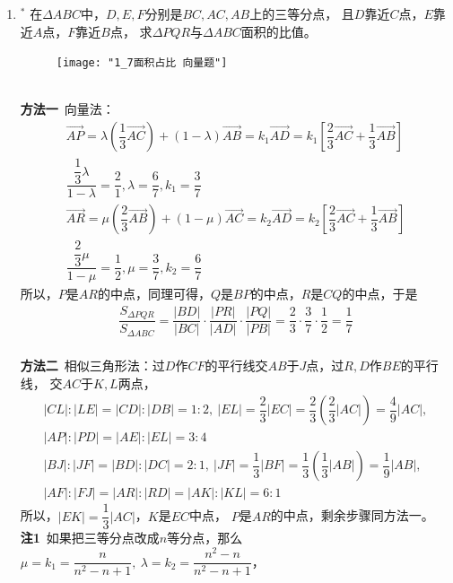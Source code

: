 \begin{enumerate}[label={【\textbf{例\thechapter.\arabic*}】},
 leftmargin=\inteval{\myenumleftmargin}pt,
 itemsep=\inteval{\myenumitempsep}pt,
 itemindent=\inteval{\myenumitemindent}pt]
\item $ ^* $
在$ \Delta ABC $中，$ D,E,F $分别是$ BC,AC,AB $上的三等分点，
且$ D $靠近$ C $点，$ E $靠近$ A $点，$ F $靠近$ B $点，
求$ \Delta PQR $与$ \Delta ABC $面积的比值。
\begin{figure}[!ht]
    \centering
    \texttt{[image: "1\_7面积占比 向量题"]}
\end{figure}
\\
\textbf{方法一}\ 向量法：\\
\begin{gather*}
    \vec{AP}=\lambda \left(\dfrac{1}{3}\vec{AC} 
    \right) +(1-\lambda)
    \vec{AB}=k_1\vec{AD}=k_1\left[
    \dfrac{2}{3}\vec{AC}+
    \dfrac{1}{3}\vec{AB}\right] \\
    \dfrac{\dfrac{1}{3}\lambda}{1-\lambda}=\dfrac{2}{1},
    \lambda=\dfrac{6}{7},k_1=\dfrac{3}{7} \\
    \vec{AR}=\mu \left(\dfrac{2}{3}\vec{AB} \right) +(1-\mu)\vec{AC}=k_2\vec{AD}=k_2\left[ \dfrac{2}{3}\vec{AC}+
    \dfrac{1}{3}\vec{AB} \right] \\
    \dfrac{\dfrac{2}{3}\mu}{1-\mu}=\dfrac{1}{2},\mu=\dfrac{3}{7},
    k_2=\dfrac{6}{7} 
\end{gather*}
所以，$ P $是$ AR $的中点，同理可得，$ Q $是$ BP $的中点，$ R $是$ CQ $的中点，于是
\begin{gather*}
    \dfrac{S_{\Delta PQR}}{S_{\Delta ABC}} =\dfrac{|BD|}{|BC|}\cdot
    \dfrac{|PR|}{|AD|}\cdot \dfrac{|PQ|}{|PB|}=\dfrac{2}{3}\cdot \dfrac{3}{7}\cdot
    \dfrac{1}{2} =\dfrac{1}{7}
\end{gather*}
\\
\textbf{方法二}\ 相似三角形法：过$ D $作$ CF $的平行线交$ AB $于$ J $点，过$ R,D $作$ BE $的平行线，
交$ AC $于$ K,L $两点，
\begin{gather*}
    |CL|:|LE|=|CD|:|DB|=1:2,\ |EL|=\dfrac{2}{3}|EC|=
    \dfrac{2}{3}\left(\dfrac{2}{3} |AC|\right) =\dfrac{4}{9}|AC|,\\
    |AP|:|PD|=|AE|:|EL|=3:4 \\
    |BJ|:|JF|=|BD|:|DC|=2:1,\ |JF|=\dfrac{1}{3}|BF|=
    \dfrac{1}{3}\left(\dfrac{1}{3}|AB| \right)=\dfrac{1}{9}|AB|, \\
    |AF|:|FJ|=|AR|:|RD|=|AK|:|KL|=6:1  
\end{gather*}
所以，$ |EK|=\dfrac{1}{3}|AC| $，$ K $是$ EC $中点，
$ P $是$ AR $的中点，剩余步骤同方法一。\\
\textbf{注1}\ 如果把三等分点改成$ n $等分点，那么$     \mu=k_1=\dfrac{n}{n^2-n+1},\ \lambda=k_2=\dfrac{n^2-n}{n^2-n+1} $，
\begin{gather*}

\end{gather*}
\end{enumerate}
